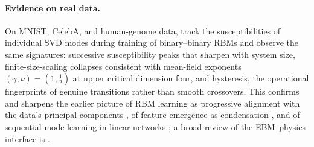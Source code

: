 \paragraph{Evidence on real data.} On MNIST, CelebA, and human-genome
data, \citet{bachtis2024cascade} track the susceptibilities of individual
SVD modes during training of binary--binary RBMs and observe the same
signatures: successive susceptibility peaks that sharpen with system
size, finite-size-scaling collapses consistent with mean-field exponents
$(\gamma, \nu) = (1, \tfrac12)$ at upper critical dimension four, and
hysteresis, the operational fingerprints of genuine transitions rather
than smooth crossovers. This confirms and sharpens the earlier picture of
RBM learning as progressive alignment with the data's principal
components \citep{decelle2017spectral}, of feature emergence as
condensation \citep{tubiana2017emergence}, and of sequential mode
learning in linear networks \citep{saxe2014exact}; a broad review of the
EBM--physics interface is \citet{carbone2025hitchhiker}.

